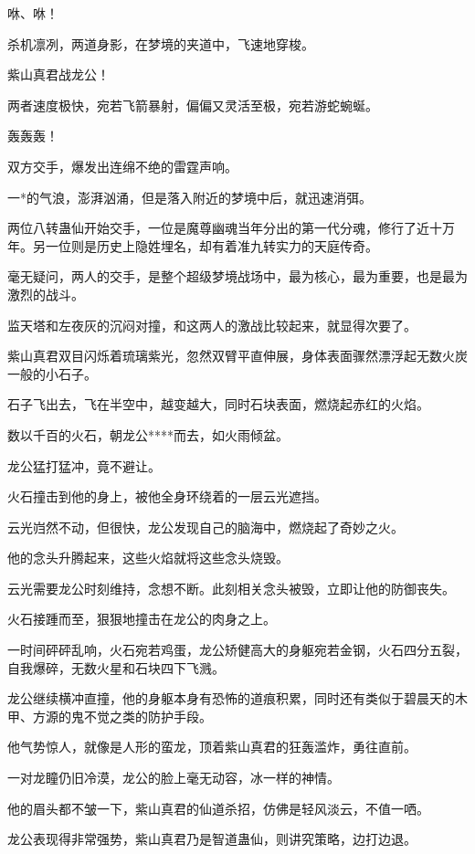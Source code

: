 
\begin{this_body}

咻、咻！

杀机凛冽，两道身影，在梦境的夹道中，飞速地穿梭。

紫山真君战龙公！

两者速度极快，宛若飞箭暴射，偏偏又灵活至极，宛若游蛇蜿蜒。

轰轰轰！

双方交手，爆发出连绵不绝的雷霆声响。

一*的气浪，澎湃汹涌，但是落入附近的梦境中后，就迅速消弭。

两位八转蛊仙开始交手，一位是魔尊幽魂当年分出的第一代分魂，修行了近十万年。另一位则是历史上隐姓埋名，却有着准九转实力的天庭传奇。

毫无疑问，两人的交手，是整个超级梦境战场中，最为核心，最为重要，也是最为激烈的战斗。

监天塔和左夜灰的沉闷对撞，和这两人的激战比较起来，就显得次要了。

紫山真君双目闪烁着琉璃紫光，忽然双臂平直伸展，身体表面骤然漂浮起无数火炭一般的小石子。

石子飞出去，飞在半空中，越变越大，同时石块表面，燃烧起赤红的火焰。

数以千百的火石，朝龙公****而去，如火雨倾盆。

龙公猛打猛冲，竟不避让。

火石撞击到他的身上，被他全身环绕着的一层云光遮挡。

云光岿然不动，但很快，龙公发现自己的脑海中，燃烧起了奇妙之火。

他的念头升腾起来，这些火焰就将这些念头烧毁。

云光需要龙公时刻维持，念想不断。此刻相关念头被毁，立即让他的防御丧失。

火石接踵而至，狠狠地撞击在龙公的肉身之上。

一时间砰砰乱响，火石宛若鸡蛋，龙公矫健高大的身躯宛若金钢，火石四分五裂，自我爆碎，无数火星和石块四下飞溅。

龙公继续横冲直撞，他的身躯本身有恐怖的道痕积累，同时还有类似于碧晨天的木甲、方源的鬼不觉之类的防护手段。

他气势惊人，就像是人形的蛮龙，顶着紫山真君的狂轰滥炸，勇往直前。

一对龙瞳仍旧冷漠，龙公的脸上毫无动容，冰一样的神情。

他的眉头都不皱一下，紫山真君的仙道杀招，仿佛是轻风淡云，不值一哂。

龙公表现得非常强势，紫山真君乃是智道蛊仙，则讲究策略，边打边退。


\end{this_body}
